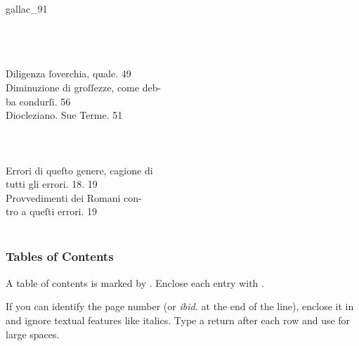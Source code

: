 \begin{sampleImage}[ 2]{gallac_91}

\begin{typeLatin}
 \\
 \\
\someText \\
Diligenza ſoverchia, quale.  49 \\
Diminuzione di groſſezze, come deb- \\
 ba condurſi.  56 \\
Diocleziano. Sue Terme.  51  \\
\someText \\
 \\
\someText \\
Errori di queſto genere, cagione di \\
 tutti gli errori.  18. 19 \\
 Provvedimenti dei Romani con- \\
 tro a queſti errori.  19 \\
\someText \\
\end{typeLatin}
\end{sampleImage}


\subsubsection{Tables of Contents}
\label{section tables of contents}

\begin{mainrule}
  A table of contents is marked by . Enclose each entry with .

  If you can identify the page number (or \emph{ibid.} at the end of the line), enclose it in  and ignore textual features like italics. Type a return after each row and use  for large spaces.
\end{mainrule}

